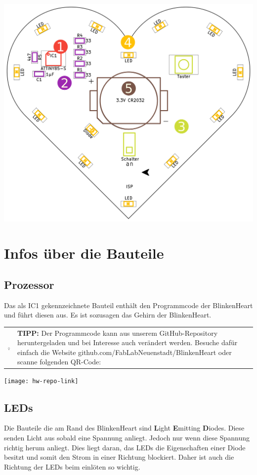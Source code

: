 \documentclass{book} %
\newcommand{\hintbox}[1]{
\begin{center}
	\begin{tabularx}{\linewidth}{
			>{\columncolor{hintbackground}}c
			>{\columncolor{hintbackground}}X}
		\raisebox{\dimexpr2\baselineskip-\height/2-\tabcolsep}
		{\includegraphics[width=1cm]{icons/002-technology}}&
		\raisebox{\tabcolsep}{\strut}\textbf{TIPP:} #1\raisebox{-\tabcolsep}{\strut}
	\end{tabularx}
\end{center}
}
\begin{document}
\begin{center}
	\includegraphics{pcb/solder_order}
\end{center}

\newpage
\section{Infos über die Bauteile}
\subsection{Prozessor}
Das als IC1 gekennzeichnete Bauteil enthält den Programmcode der BlinkenHeart und führt diesen aus. Es ist sozusagen das Gehirn der BlinkenHeart.

\hintbox{Der Programmcode kann aus unserem GitHub-Repository heruntergeladen und bei Interesse auch verändert werden. Besuche dafür einfach die Website github.com/FabLabNeuenstadt/BlinkenHeart oder scanne folgenden QR-Code:}
\begin{center}
	\texttt{[image: hw-repo-link]}
\end{center}

\subsection{LEDs}
Die Bauteile die am Rand des BlinkenHeart sind
\textbf{L}ight \textbf{E}mitting \textbf{D}iodes.
Diese senden Licht aus sobald eine Spannung anliegt.
Jedoch nur wenn diese Spannung richtig herum anliegt.
Dies liegt daran, das LEDs die Eigenschaften einer Diode besitzt und
somit den Strom in einer Richtung blockiert.
Daher ist auch die Richtung der LEDs beim einlöten so wichtig.
\end{document}
